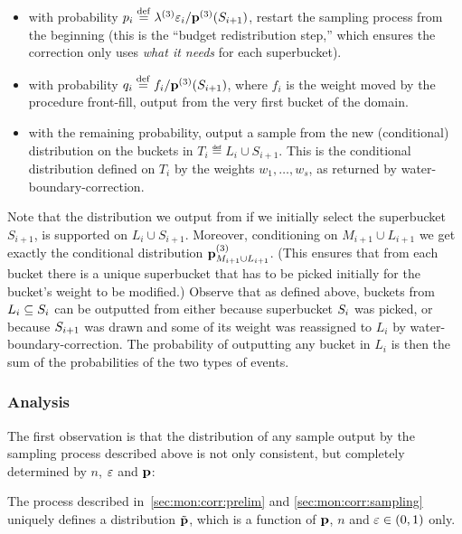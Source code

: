 \begin{itemize}
  { 
  \begin{itemize}
  \item with probability $p_i\stackrel{\rm def}{=}\lambda^{(3)}\varepsilon_i/\mathbf{p}^{(3)}(S_{i+1})$, restart the sampling process from the beginning (this is the ``budget redistribution step,'' which ensures the correction only uses \emph{what it needs} for each superbucket).
  \item with probability  $q_i\stackrel{\rm def}{=} f_i/\mathbf{p}^{(3)}(S_{i+1})$, where $f_i$ is the weight moved by the procedure \textsf{front-fill}, output {from} the very first {bucket} of the domain.      
    \item {with the remaining probability, output a sample from the new (conditional) distribution on the buckets in $T_i\eqdef L_i\cup S_{i+1}$. This is the conditional distribution defined {on $T_i$  by the weights $w_1,\dots, w_s$, as returned by} \textsf{water-boundary-correction}.}
  \end{itemize}
      } 
\end{itemize}
Note that the distribution we output from if we initially select the superbucket $S_{i+1}$, is supported on $L_i\cup S_{i+1}$. Moreover, conditioning on $M_{i+1}\cup L_{i+1}$ we get exactly the conditional distribution $\mathbf{p}^{(3)}_{M_{i+1}\cup {L_{i+1}}}$. (This ensures that from each bucket there is a unique superbucket that has to be picked initially for the bucket's weight to be modified.) {Observe that as defined above, buckets from $L_i\subseteq S_i$ can be outputted from either because superbucket $S_i$ was picked, or because $S_{i+1}$ was drawn and some of its weight was reassigned to $L_i$ by \textsf{water-boundary-correction}. The probability of outputting any bucket in $L_i$ is then the sum of the probabilities of the two types of events.} 



\subsubsection{Analysis}

The first observation is that the distribution of any sample output by the sampling process described above is not only consistent, but completely determined by $n$, $\varepsilon$ and $\mathbf{p}$:
\begin{claim}\label{lemma:correct:waterfill:defined}
The process described in~\cref{sec:mon:corr:prelim} and \ref{sec:mon:corr:sampling} uniquely defines a distribution $\tilde{\mathbf{p}}$, which is a function of $\mathbf{p}$, $n$ and $\varepsilon\in(0,1)$ only.
\end{claim}

